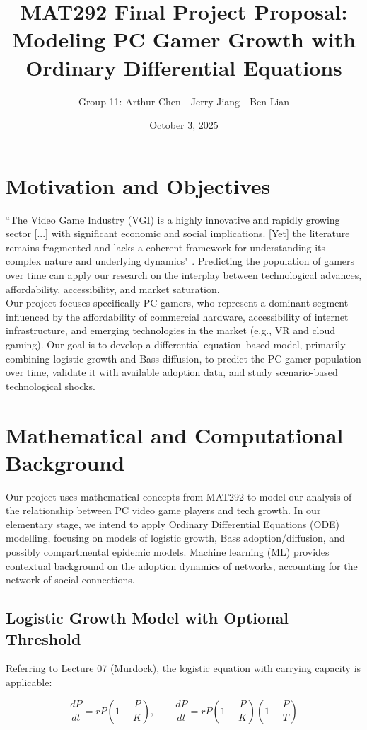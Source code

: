 \documentclass{article}
\title{\vspace{-2cm}MAT292 Final Project Proposal: \\ Modeling PC Gamer Growth with Ordinary Differential Equations}
\author{Group 11: Arthur Chen - Jerry Jiang - Ben Lian}
\date{October 3, 2025}
\begin{document}
\maketitle

\section{Motivation and Objectives}
``The Video Game Industry (VGI) is a highly innovative and rapidly growing sector [...] with significant economic and social implications. [Yet] the literature remains fragmented and lacks a coherent framework for understanding its complex nature and underlying dynamics" \cite{GOH2023100100}. Predicting the population of gamers over time can apply our research on the interplay between technological advances, affordability, accessibility, and market saturation.\\

\noindent 
Our project focuses specifically PC gamers, who represent a dominant segment influenced by the affordability of commercial hardware, accessibility of internet infrastructure, and emerging technologies in the market (e.g., VR and cloud gaming). Our goal is to develop a differential equation–based model, primarily combining logistic growth and Bass diffusion, to predict the PC gamer population over time, validate it with available adoption data, and study scenario-based technological shocks.

\section{Mathematical and Computational Background}
Our project uses mathematical concepts from MAT292 to model our analysis of the relationship between PC video game players and tech growth. In our elementary stage, we intend to apply Ordinary Differential Equations (ODE) modelling, focusing on models of logistic growth, Bass adoption/diffusion, and possibly compartmental epidemic models. Machine learning (ML) provides contextual background on the adoption dynamics of networks, accounting for the network of social connections. 

\subsection{Logistic Growth Model with Optional Threshold}
Referring to Lecture 07 (Murdock), the logistic equation with carrying capacity is applicable: 

\begin{equation}
    \frac{dP}{dt} = rP \left(1 - \frac{P}{K}\right), 
    \qquad \frac{dP}{dt} = rP \left(1 - \frac{P}{K}\right) \left(1 - \frac{P}{T}\right)
\end{equation}
\end{document}
